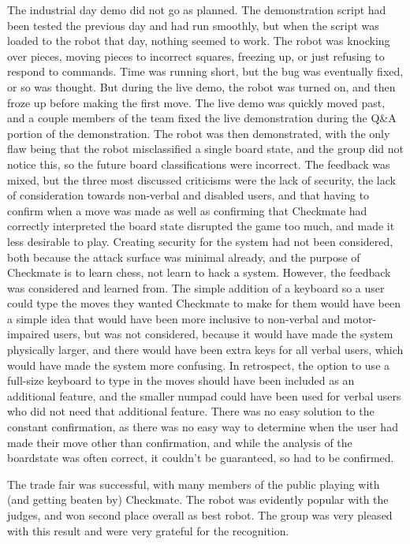 \documentclass[onecolumn]{IEEEtran}
\begin{document}
The industrial day demo did not go as planned. The demonstration script had been tested the previous day and had run smoothly, but when the script was loaded to the robot that day, nothing seemed to work. The robot was knocking over pieces, moving pieces to incorrect squares, freezing up, or just refusing to respond to commands. Time was running short, but the bug was eventually fixed, or so was thought. But during the live demo, the robot was turned on, and then froze up before making the first move. The live demo was quickly moved past, and a couple members of the team fixed the live demonstration during the Q\&A portion of the demonstration. The robot was then demonstrated, with the only flaw being that the robot misclassified a single board state, and the group did not notice this, so the future board classifications were incorrect. The feedback was mixed, but the three most discussed criticisms were the lack of security, the lack of consideration towards non-verbal and disabled users, and that having to confirm when a move was made as well as confirming that Checkmate had correctly interpreted the board state disrupted the game too much, and made it less desirable to play. Creating security for the system had not been considered, both because the attack surface was minimal already, and the purpose of Checkmate is to learn chess, not learn to hack a system. However, the feedback was considered and learned from. The simple addition of a keyboard so a user could type the moves they wanted Checkmate to make for them would have been a simple idea that would have been more inclusive to non-verbal and motor-impaired users, but was not considered, because it would have made the system physically larger, and there would have been extra keys for all verbal users, which would have made the system more confusing. In retrospect, the option to use a full-size keyboard to type in the moves should have been included as an additional feature, and the smaller numpad could have been used for verbal users who did not need that additional feature. There was no easy solution to the constant confirmation, as there was no easy way to determine when the user had made their move other than confirmation, and while the analysis of the boardstate was often correct, it couldn't be guaranteed, so had to be confirmed. \par
The trade fair was successful, with many members of the public playing with (and getting beaten by) Checkmate. The robot was evidently popular with the judges, and won second place overall as best robot. The group was very pleased with this result and were very grateful for the recognition. \\
\newpage
\end{document}
